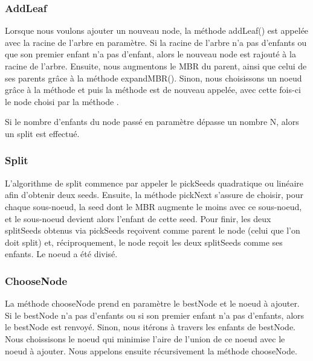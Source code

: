 \documentclass[utf8]{article}
\begin{document}
\begin{large}
    \subsubsection{AddLeaf}\label{addLeaf}
    \indent
    \par
    Lorsque nous voulons ajouter un nouveau node, la méthode addLeaf() est appelée
    avec la racine de l'arbre en paramètre. Si la racine de l'arbre n'a pas
    d'enfants ou que son premier enfant n'a pas d'enfant, alors le nouveau node
    est rajouté à la racine de l'arbre. Ensuite, nous augmentons le MBR du parent,
    ainsi que celui de ses parents grâce à la méthode expandMBR(). Sinon, nous
    choisissons un noeud grâce à la méthode  et puis la méthode 
    est de nouveau appelée, avec cette fois-ci le node choisi par la méthode
    .
    \par
    \indent
    Si le nombre d'enfants du node passé en paramètre dépasse un nombre N, alors
    un split est effectué.
    \par
    \subsubsection{Split}\label{split}
    \indent
    \par
    L'algorithme de split commence par appeler le pickSeeds quadratique ou
    linéaire afin d'obtenir deux seeds. \newline Ensuite, la
    méthode pickNext s'assure de choisir, pour chaque sous-noeud, la seed dont le
    MBR augmente le moins avec ce sous-noeud, et le sous-noeud devient alors
    l'enfant de cette seed. \newline Pour finir, les deux splitSeeds obtenus via
    pickSeeds reçoivent comme parent le node (celui que l'on doit split) et,
    réciproquement, le node reçoit les deux splitSeeds comme ses enfants. Le noeud
    a été divisé.
    \par

    \subsubsection{ChooseNode}\label{chooseNode}
    \indent
    \par
    La méthode chooseNode prend en paramètre le bestNode et le noeud à ajouter.
    Si le bestNode n'a pas d'enfants ou si son premier enfant n'a pas d'enfants,
    alors le bestNode est renvoyé. Sinon, nous itérons à travers les enfants de
    bestNode. Nous choissisons le noeud qui minimise l'aire de l'union de ce noeud avec le noeud à ajouter. Nous appelons ensuite récursivement la méthode chooseNode.


\end{large}
\end{document}
